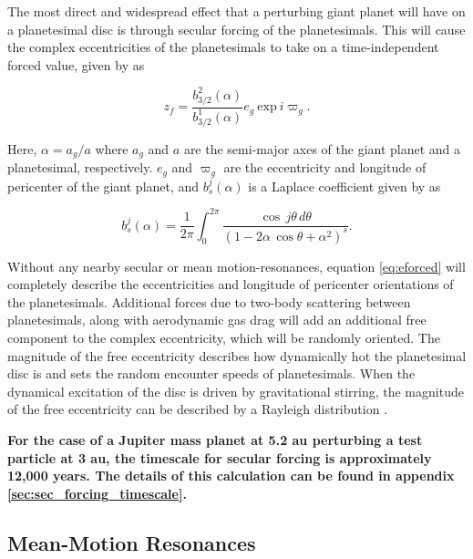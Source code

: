 \documentclass[fleqn,usenatbib]{mnras}
\begin{document}
The most direct and widespread effect that a perturbing giant planet will have on a planetesimal disc is through secular forcing of the planetesimals. This will 
cause the complex eccentricities of the planetesimals to take on a time-independent 
forced value, given by \citep{1999ApJ...527..918W} as

\begin{equation}\label{eq:eforced}
	z_{f} = \frac{b^{2}_{3/2} (\alpha)}{b^{1}_{3/2} (\alpha)} e_{g} ~ \mathrm{exp} ~ i \varpi_{g}.
\end{equation}

\noindent Here, $\alpha = a_{g} / a$ where $a_{g}$ and $a$ are the semi-major axes of the giant planet and a planetesimal, 
respectively. $e_{g}$ and $\varpi_{g}$ are the eccentricity and
longitude of pericenter of the giant planet, and $b^{j}_{s} (\alpha)$ is a 
Laplace coefficient given by \citep{1999ssd..book.....M} as

\begin{equation}\label{eq:lap}
	b_{s}^{j}(\alpha) = \frac{1}{2 \pi} \int_{0}^{2 \pi} \frac{\cos \, j \theta \, d \theta}{\left( 1 - 2 \alpha \, \cos \theta + \alpha^2 \right)^{s}}.
\end{equation}

Without any nearby secular or mean motion-resonances, equation \ref{eq:eforced} will completely describe the eccentricities and longitude of  
pericenter orientations of the planetesimals. Additional forces due to two-body scattering between planetesimals, along with 
aerodynamic gas drag will add an additional free component to the complex eccentricity, which will be randomly oriented. The 
magnitude of the free eccentricity describes how dynamically hot the planetesimal disc is and sets the random encounter speeds of 
planetesimals. When the dynamical excitation of the disc is driven by gravitational stirring, the magnitude of the free eccentricity can 
be described by a Rayleigh distribution \citep{1992Icar...96..107I}.

\textbf{For the case of a Jupiter mass planet at 5.2 au perturbing a test particle at 3 au, the timescale for secular forcing is approximately 12,000 years. The details of this calculation
can be found in appendix \ref{sec:sec_forcing_timescale}.}

\subsection{Mean-Motion Resonances}\label{sec:mmr}
\end{document}
